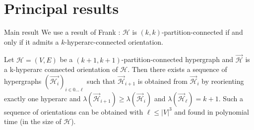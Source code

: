 \documentclass[10pt, aspectratio=43,compress]{beamer}
\begin{document}
	\section{Principal results}
	\begin{frame}{Main result}
		We use a result of Frank : $\mathcal{H}$ is $(k, k)$-partition-connected if and only if it admits a $k$-hyperarc-connected orientation.

		\begin{tcolorbox}[colback=richcarmine!5!white,colframe=richcarmine!75!black,title=Main result (Theorem 7)]
			Let $\mathcal{H} = (V, E)$ be a $(k+1, k+1)$-partition-connected hypergraph and $\vec{\mathcal{H}}$ is a k-hyperarc connected orientation of $\mathcal{H}$. Then there exists a sequence of hypergraphs $(\vec{\mathcal{H}_{i}})_{i\in0\dots\ell}$ such that $\vec{\mathcal{H}}_{i+1}$ is obtained from $\vec{\mathcal{H}}_{i}$ by reorienting exactly one hyperarc and $\lambda(\vec{\mathcal{H}}_{i+1}) \geq \lambda(\vec{\mathcal{H}}_{i})$ and $\lambda(\vec{\mathcal{H}}_{\ell}) = k + 1$. Such a sequence of orientations can be obtained with $\ell \leq |V|^{3}$ and found in polynomial time (in the size of $\mathcal{H}$).
		\end{tcolorbox}
	\end{frame}
	
\end{document}
